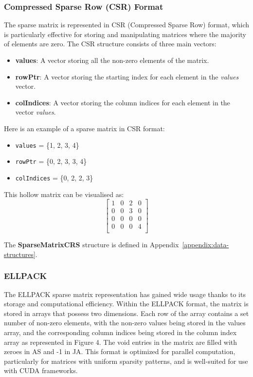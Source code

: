 \documentclass[12pt,oneside]{book} %
\begin{document}
\subsubsection{Compressed Sparse Row (CSR) Format}
The sparse matrix is represented in CSR (Compressed Sparse Row) format, which
is particularly effective for storing and manipulating matrices where the
majority of elements are zero. The CSR structure consists of three main
vectors:
\begin{itemize}
    \item \textbf{values}: A vector storing all the non-zero elements of the matrix.
    \item \textbf{rowPtr}: A vector storing the starting index for each element in the
          \textit{values} vector.
    \item \textbf{colIndices}: A vector storing the column indices for each element in the vector \textit{values}.
          \
\end{itemize}

Here is an example of a sparse matrix in CSR format:
\begin{itemize}
    \item \texttt{values} = \{1, 2, 3, 4\}
    \item \texttt{rowPtr} = \{0, 2, 3, 3, 4\}
    \item \texttt{colIndices} = \{0, 2, 2, 3\}
\end{itemize}

This hollow matrix can be visualised as:
\[
    \begin{bmatrix}
        1 & 0 & 2 & 0 \\
        0 & 0 & 3 & 0 \\
        0 & 0 & 0 & 0 \\
        0 & 0 & 0 & 4 \\
    \end{bmatrix}
\]

The \textbf{SparseMatrixCRS} structure is defined in
Appendix~\ref{appendix:data-structures}.

\subsubsection{ELLPACK }

The ELLPACK sparse matrix representation has gained wide usage thanks to its
storage and computational efficiency. Within the ELLPACK format, the matrix is
stored in arrays that possess two dimensions. Each row of the array contains a
set number of non-zero elements, with the non-zero values being stored in the
values array, and the corresponding column indices being stored in the column
index array as represented in Figure 4. The void entries in the matrix are
filled with zeroes in AS and -1 in JA. This format is optimized for parallel
computation, particularly for matrices with uniform sparsity patterns, and is
well-suited for use with CUDA frameworks.
\end{document}
